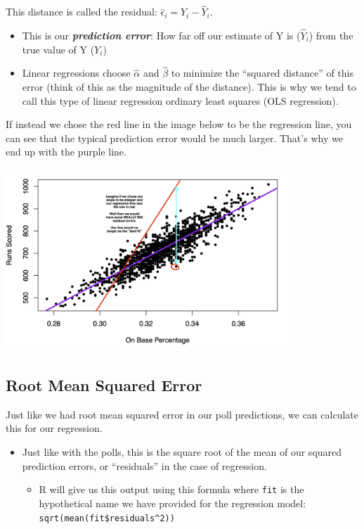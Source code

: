 \documentclass[
  letterpaper,
  DIV=11,
  numbers=noendperiod]{scrreprt}
\providecommand{\tightlist}{%
  \setlength{\itemsep}{0pt}\setlength{\parskip}{0pt}}\usepackage{longtable,booktabs,array}
\begin{document}
This distance is called the residual:
\(\hat \epsilon_i = Y_i - \hat Y_i\).

\begin{itemize}
\tightlist
\item
  This is our \textbf{\emph{prediction error}}: How far off our estimate
  of Y is (\(\hat Y_i\)) from the true value of Y (\(Y_i\))
\item
  Linear regressions choose \(\hat \alpha\) and \(\hat \beta\) to
  minimize the ``squared distance'' of this error (think of this as the
  magnitude of the distance). This is why we tend to call this type of
  linear regression ordinary least squares (OLS regression).
\end{itemize}

If instead we chose the red line in the image below to be the regression
line, you can see that the typical prediction error would be much
larger. That's why we end up with the purple line.

\includegraphics[width=0.8\textwidth,height=\textheight]{images/bestfit.png}

\hypertarget{root-mean-squared-error}{%
\subsection{Root Mean Squared Error}\label{root-mean-squared-error}}

Just like we had root mean squared error in our poll predictions, we can
calculate this for our regression.

\begin{itemize}
\tightlist
\item
  Just like with the polls, this is the square root of the mean of our
  squared prediction errors, or ``residuals'' in the case of regression.

  \begin{itemize}
  \tightlist
  \item
    R will give us this output using this formula where \texttt{fit} is
    the hypothetical name we have provided for the regression model:
    \texttt{sqrt(mean(fit\$residuals\^{}2))}
  \end{itemize}
\end{itemize}
\end{document}
